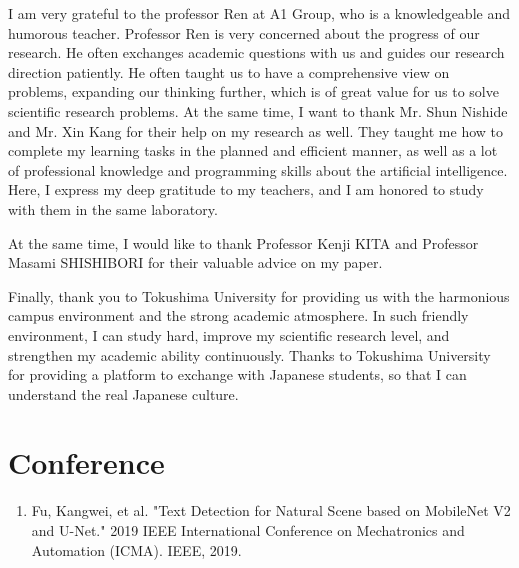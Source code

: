 \documentclass[22pt, UTF8]{article}
\numberwithin{figure}{section}
\numberwithin{table}{section}
\numberwithin{equation}{section} %
\begin{document}
\setlength\parindent{2em} I am very grateful to the professor Ren at A1 Group, who is a knowledgeable and humorous teacher. Professor Ren is very concerned about the progress of our research. He often exchanges academic questions with us and guides our research direction patiently. He often taught us to have a comprehensive view on problems, expanding our thinking further, which is of great value for us to solve scientific research problems. At the same time, I want to thank Mr. Shun Nishide and Mr. Xin Kang for their help on my research as well. They taught me how to complete my learning tasks in the planned and efficient manner, as well as a lot of professional knowledge and programming skills about the artificial intelligence. Here, I express my deep gratitude to my teachers, and I am honored to study with them in the same laboratory.

\setlength\parindent{2em} At the same time, I would like to thank Professor Kenji KITA and Professor Masami SHISHIBORI for their valuable advice on my paper.

\setlength\parindent{2em} Finally, thank you to Tokushima University for providing us with the harmonious campus environment and the strong academic atmosphere. In such friendly environment, I can study hard, improve my scientific research level, and strengthen my academic ability continuously. Thanks to Tokushima University for providing a platform to exchange with Japanese students, so that I can understand the real Japanese culture.

\vspace{1cm}
\newpage

\section*{Conference} %

\begin{enumerate}
\item Fu, Kangwei, et al. "Text Detection for Natural Scene based on MobileNet V2 and U-Net." 2019 IEEE International Conference on Mechatronics and Automation (ICMA). IEEE, 2019.
\end{enumerate}
\end{document}

